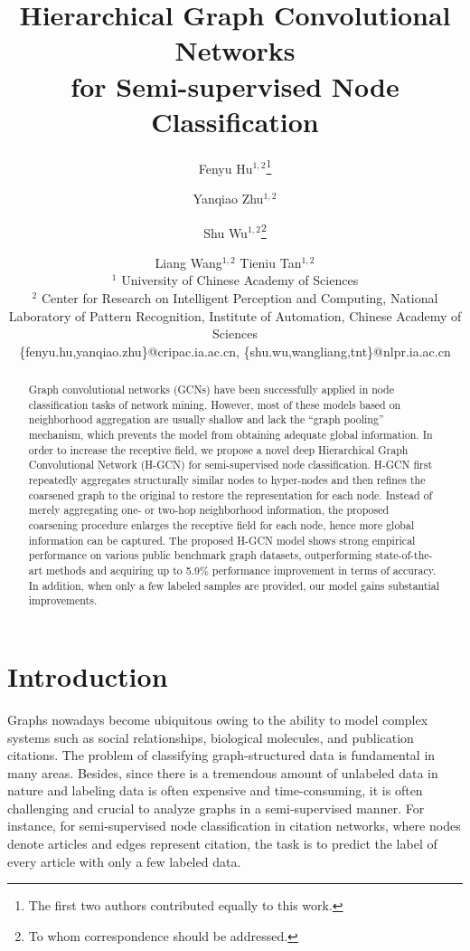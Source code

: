 \documentclass{article}
\title{Hierarchical Graph Convolutional Networks \\ for Semi-supervised Node Classification}
\author{
Fenyu Hu$^{1,2}$\footnote{The first two authors contributed equally to this work.}\and
Yanqiao Zhu$^{1,2}$\footnotemark[1]\and
Shu Wu$^{1,2}$\footnote{To whom correspondence should be addressed.}\and
Liang Wang$^{1,2}$\And
Tieniu Tan$^{1,2}$\\
\affiliations
$^1$
University of Chinese Academy of Sciences\\
$^2$
Center for Research on Intelligent Perception and Computing, National Laboratory of Pattern Recognition, Institute of Automation, Chinese Academy of Sciences\\
\emails
\{fenyu.hu,yanqiao.zhu\}@cripac.ia.ac.cn,
\{shu.wu,wangliang,tnt\}@nlpr.ia.ac.cn
}
\begin{document}
\maketitle

\begin{abstract}
Graph convolutional networks (GCNs) have been successfully applied in node classification tasks of network mining. However, most of these models based on neighborhood aggregation are usually shallow and lack the ``graph pooling'' mechanism, which prevents the model from obtaining adequate global information. In order to increase the receptive field, we propose a novel deep Hierarchical Graph Convolutional Network (H-GCN) for semi-supervised node classification. H-GCN first repeatedly aggregates structurally similar nodes to hyper-nodes and then refines the coarsened graph to the original to restore the representation for each node. Instead of merely aggregating one- or two-hop neighborhood information, the proposed coarsening procedure enlarges the receptive field for each node, hence more global information can be captured. The proposed H-GCN model shows strong empirical performance on various public benchmark graph datasets, outperforming state-of-the-art methods and acquiring up to 5.9\% performance improvement in terms of accuracy. In addition, when only a few labeled samples are provided, our model gains substantial improvements.
\end{abstract}

\section{Introduction}

Graphs nowadays become ubiquitous owing to the ability to model complex systems such as social relationships, biological molecules, and publication citations. The problem of classifying graph-structured data is fundamental in many areas. Besides, since there is a tremendous amount of unlabeled data in nature and labeling data is often expensive and time-consuming, it is often challenging and crucial to analyze graphs in a semi-supervised manner. For instance, for semi-supervised node classification in citation networks, where nodes denote articles and edges represent citation, the task is to predict the label of every article with only a few labeled data.
\end{document}
